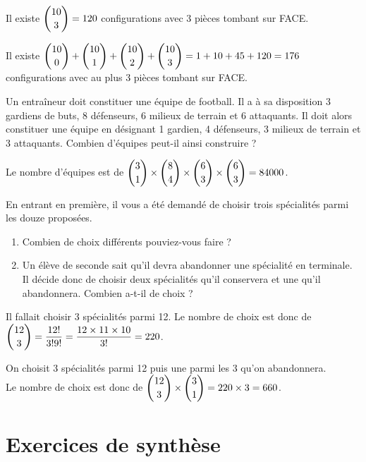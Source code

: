\documentclass[11pt,fleqn, openany]{book} %
\begin{document}
\begin{solution}Il existe $\dbinom{10}{3}=120$ configurations avec 3 pièces tombant sur FACE. 

Il existe $\dbinom{10}{0}+\dbinom{10}{1}+\dbinom{10}{2}+\dbinom{10}{3}=1+10+45+120=176$ configurations avec au plus 3 pièces tombant sur FACE.\end{solution}





\begin{exercise}Un entraîneur doit constituer une équipe de football. Il a à sa disposition 3 gardiens de buts, 8 défenseurs, 6 milieux de terrain et 6 attaquants. Il doit alors constituer une équipe en désignant 1 gardien, 4 défenseurs, 3 milieux de terrain et 3 attaquants. Combien d'équipes peut-il ainsi construire ?\end{exercise}

\begin{solution}Le nombre d'équipes est de $\dbinom{3}{1} \times \dbinom{8}{4} \times \dbinom{6}{3} \times \dbinom{6}{3} = 84000$.\end{solution}




\begin{exercise}En entrant en première, il vous a été demandé de choisir trois spécialités parmi les douze proposées.
\begin{enumerate}
\item Combien de choix différents pouviez-vous faire ?
\item Un élève de seconde sait qu'il devra abandonner une spécialité en terminale. Il décide donc de choisir deux spécialités qu'il conservera et une qu'il abandonnera. Combien a-t-il de choix ?
\end{enumerate}\end{exercise}

\begin{solution}Il fallait choisir 3 spécialités parmi 12. Le nombre de choix est donc de $\dbinom{12}{3}=\dfrac{12!}{3!9!}=\dfrac{12 \times 11 \times 10}{3!}=220$.

On choisit 3 spécialités parmi 12 puis une parmi les 3 qu'on abandonnera. \\Le nombre de choix est donc de $\dbinom{12}{3} \times \dbinom{3}{1}=220 \times 3 = 660$.\end{solution}



\section*{Exercices de synthèse}
\end{document}

